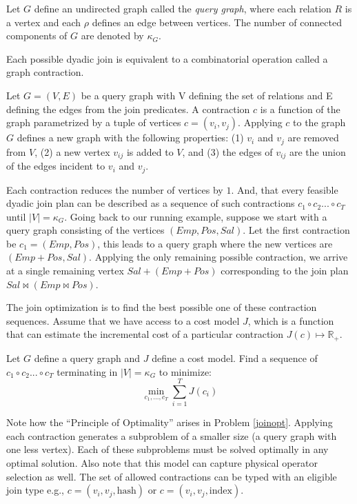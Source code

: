 \begin{definition}
Let $G$ define an undirected graph called the \emph{query graph}, where each relation $R$ is a vertex and each $\rho$ defines an edge between vertices. The number of connected components of $G$ are denoted by $\kappa_G$.
\end{definition}

Each possible dyadic join is equivalent to a combinatorial operation called a graph contraction.

\begin{definition}[Contraction]
Let $G = (V,E)$ be a query graph with V defining the set of relations and E defining the edges from the join predicates. A contraction $c$ is a function of the graph parametrized by a tuple of vertices $c=(v_i, v_j)$. Applying $c$ to the graph $G$ defines a new graph with the following properties: (1) $v_i$ and $v_j$ are removed from $V$, (2) a new vertex $v_{ij}$ is added to $V$, and (3) the edges of $v_{ij}$ are the union of the edges incident to $v_i$ and $v_j$. 
\end{definition}

Each contraction reduces the number of vertices by $1$. And, that every feasible dyadic join plan can be described as a sequence of such contractions $c_1 \circ c_2 ...\circ c_{T}$ until $|V| = \kappa_G$. Going back to our running example, suppose we start with a query graph consisting of the vertices $(Emp, Pos, Sal)$. Let the first contraction be $c_1 = (Emp, Pos)$, this leads to a query graph where the new vertices are $(Emp+Pos, Sal)$. Applying the only remaining possible contraction, we arrive at a single remaining vertex $Sal+(Emp+Pos)$ corresponding to the join plan $Sal \bowtie (Emp \bowtie Pos)$. 

The join optimization is to find the best possible one of these contraction sequences. Assume that we have access to a cost model $J$, which is a function that can estimate the incremental cost of a particular contraction $J(c) \mapsto \mathbb{R}_+$. 

\begin{problem}
Let $G$ define a query graph and $J$ define a cost model. Find a sequence of $c_1 \circ c_2 ...\circ c_{T}$ terminating in $|V| = \kappa_G$ to minimize:
\[
\min_{c_1,...,c_T} \sum_{i=1}^T J(c_i)
\]\label{joinopt}
\end{problem}

Note how the ``Principle of Optimality'' arises in Problem \ref{joinopt}. Applying each contraction generates a subproblem of a smaller size (a query graph with one less vertex). Each of these subproblems must be solved optimally in any optimal solution. Also note that this model can capture physical operator selection as well. The set of allowed contractions can be typed with an eligible join type e.g., $c=(v_i, v_j, \text{hash})$ or $c=(v_i, v_j, \text{index})$.

